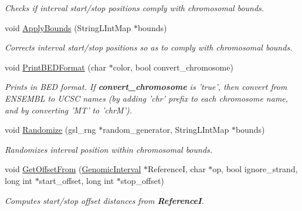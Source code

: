 \begin{CompactItemize}
\begin{CompactList}\small\item\em Checks if interval start/stop positions comply with chromosomal bounds. \item\end{CompactList}\item 
\hypertarget{classGenomicInterval_c28099b569624adcf3b327e922e5e4e5}{
void \hyperlink{classGenomicInterval_c28099b569624adcf3b327e922e5e4e5}{ApplyBounds} (StringLIntMap $\ast$bounds)}
\label{classGenomicInterval_c28099b569624adcf3b327e922e5e4e5}

\begin{CompactList}\small\item\em Corrects interval start/stop positions so as to comply with chromosomal bounds. \item\end{CompactList}\item 
\hypertarget{classGenomicInterval_c06925f3fcf6b47cec5c6f95aaa379c0}{
void \hyperlink{classGenomicInterval_c06925f3fcf6b47cec5c6f95aaa379c0}{PrintBEDFormat} (char $\ast$color, bool convert\_\-chromosome)}
\label{classGenomicInterval_c06925f3fcf6b47cec5c6f95aaa379c0}

\begin{CompactList}\small\item\em Prints in BED format. If {\bf convert\_\-chromosome} is 'true', then convert from ENSEMBL to UCSC names (by adding 'chr' prefix to each chromosome name, and by converting 'MT' to 'chrM'). \item\end{CompactList}\item 
\hypertarget{classGenomicInterval_75aed02c1df83acb5d7ec89e2a9949bd}{
void \hyperlink{classGenomicInterval_75aed02c1df83acb5d7ec89e2a9949bd}{Randomize} (gsl\_\-rng $\ast$random\_\-generator, StringLIntMap $\ast$bounds)}
\label{classGenomicInterval_75aed02c1df83acb5d7ec89e2a9949bd}

\begin{CompactList}\small\item\em Randomizes interval position within chromosomal bounds. \item\end{CompactList}\item 
void \hyperlink{classGenomicInterval_ab40ad7dd997948e0c04a13164e955d6}{GetOffsetFrom} (\hyperlink{classGenomicInterval}{GenomicInterval} $\ast$ReferenceI, char $\ast$op, bool ignore\_\-strand, long int $\ast$start\_\-offset, long int $\ast$stop\_\-offset)
\begin{CompactList}\small\item\em Computes start/stop offset distances from {\bf ReferenceI}. \item\end{CompactList}\end{CompactItemize}

